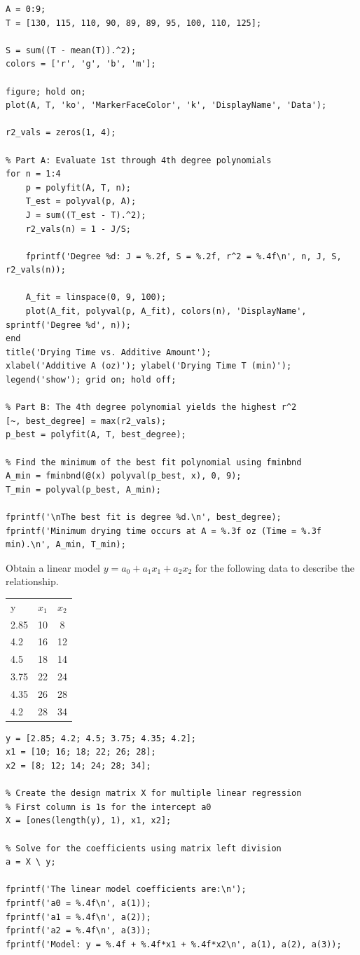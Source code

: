 \begin{lstlisting}
A = 0:9;
T = [130, 115, 110, 90, 89, 89, 95, 100, 110, 125];

S = sum((T - mean(T)).^2);
colors = ['r', 'g', 'b', 'm'];

figure; hold on;
plot(A, T, 'ko', 'MarkerFaceColor', 'k', 'DisplayName', 'Data');

r2_vals = zeros(1, 4);

% Part A: Evaluate 1st through 4th degree polynomials
for n = 1:4
    p = polyfit(A, T, n);
    T_est = polyval(p, A);
    J = sum((T_est - T).^2);
    r2_vals(n) = 1 - J/S;
    
    fprintf('Degree %d: J = %.2f, S = %.2f, r^2 = %.4f\n', n, J, S, r2_vals(n));
    
    A_fit = linspace(0, 9, 100);
    plot(A_fit, polyval(p, A_fit), colors(n), 'DisplayName', sprintf('Degree %d', n));
end
title('Drying Time vs. Additive Amount');
xlabel('Additive A (oz)'); ylabel('Drying Time T (min)');
legend('show'); grid on; hold off;

% Part B: The 4th degree polynomial yields the highest r^2
[~, best_degree] = max(r2_vals);
p_best = polyfit(A, T, best_degree);

% Find the minimum of the best fit polynomial using fminbnd
A_min = fminbnd(@(x) polyval(p_best, x), 0, 9);
T_min = polyval(p_best, A_min);

fprintf('\nThe best fit is degree %d.\n', best_degree);
fprintf('Minimum drying time occurs at A = %.3f oz (Time = %.3f min).\n', A_min, T_min);
\end{lstlisting}

Obtain a linear model $y = a_0 + a_1x_1 + a_2x_2$ for the following data to describe the relationship.

\begin{table}[h]
\centering
\begin{tabular}{lcc}
y & $x_1$ & $x_2$ \\
2.85 & 10 & 8 \\
4.2 & 16 & 12 \\
4.5 & 18 & 14 \\
3.75 & 22 & 24 \\
4.35 & 26 & 28 \\
4.2 & 28 & 34 \\
\end{tabular}
\end{table}

\begin{lstlisting}
y = [2.85; 4.2; 4.5; 3.75; 4.35; 4.2];
x1 = [10; 16; 18; 22; 26; 28];
x2 = [8; 12; 14; 24; 28; 34];

% Create the design matrix X for multiple linear regression
% First column is 1s for the intercept a0
X = [ones(length(y), 1), x1, x2];

% Solve for the coefficients using matrix left division
a = X \ y;

fprintf('The linear model coefficients are:\n');
fprintf('a0 = %.4f\n', a(1));
fprintf('a1 = %.4f\n', a(2));
fprintf('a2 = %.4f\n', a(3));
fprintf('Model: y = %.4f + %.4f*x1 + %.4f*x2\n', a(1), a(2), a(3));
\end{lstlisting}

